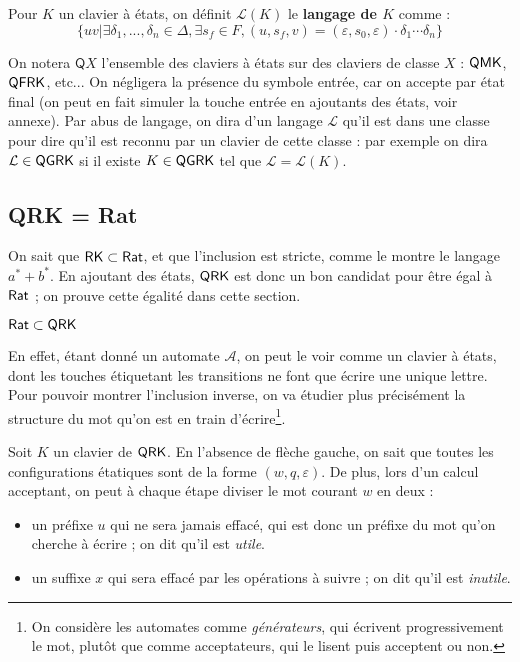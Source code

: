 \documentclass[12pt, a4paper]{article}
\renewcommand{\L}{\mathcal{L}}
\newcommand{\A}{\mathcal{A}}
\begin{document}
    \begin{langageclavierQ}
        Pour $K$ un clavier à états, on définit $\L(K)$ le \textbf{langage de $K$} comme :
        \[ \{uv | \exists\delta_1,...,\delta_n \in \Delta, \exists s_f \in F, (u,s_f,v) = (\varepsilon,s_0,\varepsilon)\cdot\delta_1\cdots\delta_n \}\]
    \end{langageclavierQ}
    On notera $\mathsf{Q}X$ l'ensemble des claviers à états sur des claviers de classe $X$ : $\mathsf{QMK}$, $\mathsf{QFRK}$, etc... 
    On négligera la présence du symbole entrée, car on accepte par état final (on peut en fait simuler la touche entrée en ajoutants des états, voir annexe).
    Par abus de langage, on dira d'un langage $\L$ qu'il est dans une classe pour dire qu'il est reconnu par un clavier de cette classe : 
    par exemple on dira $\L \in \QGRK$ si il existe $K \in \mathsf{QGRK}$ tel que $\L = \L(K)$.


    \subsection{QRK = Rat}
    On sait que \autocite[théorèmes~101/102]{bible} $\mathsf{RK} \subset \mathsf{Rat}$, et que l'inclusion est stricte, comme le montre le langage $a^* + b^*$. En ajoutant des états,
    $\mathsf{QRK}$ est donc un bon candidat pour être égal à $\mathsf{Rat}$ ; on prouve cette égalité dans cette section.
    
    \begin{RatdansQRK}
        $\mathsf{Rat} \subset \mathsf{QRK}$
    \end{RatdansQRK}
    En effet, étant donné un automate $\A$, on peut le voir comme un clavier à états, dont les touches étiquetant les transitions 
    ne font que écrire une unique lettre. \smallskip \\
    Pour pouvoir montrer l'inclusion inverse, on va étudier plus précisément la structure du mot qu'on est en train d'écrire\footnote{On considère les automates comme \emph{générateurs}, qui écrivent progressivement le mot, plutôt que comme acceptateurs, qui le lisent puis acceptent ou non.}.
    
    Soit $K$ un clavier de $\mathsf{QRK}$. En l'absence de flèche gauche, on sait que toutes les configurations étatiques sont de la forme $(w,q,\varepsilon)$. De plus, lors d'un calcul acceptant, on peut à chaque étape diviser le mot courant $w$ en deux :
    \begin{itemize}
        \item un préfixe $u$ qui ne sera jamais effacé, qui est donc un préfixe du mot qu'on cherche à écrire ; on dit qu'il est \emph{utile}.
        \item un suffixe $x$ qui sera effacé par les opérations à suivre ; on dit qu'il est \emph{inutile}.
    \end{itemize}
\end{document}
